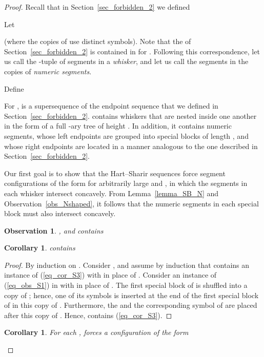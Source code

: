 \documentclass[11pt]{article}
\newtheorem{observation}[theorem]{Observation}
\newtheorem{corollary}[theorem]{Corollary}
\theoremstyle{definition}
\theoremstyle{remark}
\begin{document}
\begin{proof}

Recall that in Section~\ref{sec_forbidden_2} we defined

Let

(where the  copies of  use distinct symbols). Note that the  of Section~\ref{sec_forbidden_2} is contained in  for . Following this correspondence, let us call the -tuple of segments  in  a \emph{whisker}, and let us call the segments in the copies of  \emph{numeric segments}.

Define


For ,  is a supersequence of the endpoint sequence  that we defined in Section~\ref{sec_forbidden_2}.  contains whiskers that are nested inside one another in the form of a full -ary tree of height . In addition, it contains numeric segments, whose left endpoints are grouped into special blocks of length , and whose right endpoints are located in a manner analogous to the one described in Section~\ref{sec_forbidden_2}.

Our first goal is to show that the Hart--Sharir sequences force segment configurations of the form  for arbitrarily large  and , in which the  segments in each whisker intersect concavely. From Lemma~\ref{lemma_SB_N} and Observation~\ref{obs_Nshaped}, it follows that the  numeric segments in each special block must also intersect concavely.

\begin{observation}\label{obs_S1}
, and  contains

\end{observation}

\begin{corollary}\label{cor_S3}
 contains

\end{corollary}

\begin{proof}
By induction on . Consider , and assume by induction that  contains an instance  of (\ref{eq_cor_S3}) with  in place of . Consider an instance  of (\ref{eq_obs_S1}) in  with  in place of . The first special block of  is shuffled into a copy of ; hence, one of its symbols  is inserted at the end of the first special block of  in this copy of . Furthermore, the  and the corresponding symbol  of  are placed after this copy of . Hence,  contains (\ref{eq_cor_S3}). 
\end{proof}

\begin{corollary}\label{cor_S4}
For each ,  forces a configuration of the form


\end{corollary}
\end{proof}
\end{document}
